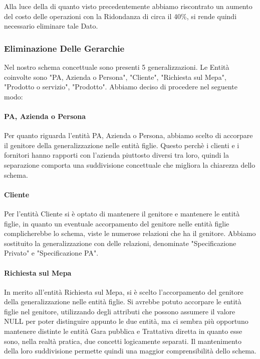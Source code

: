 Alla luce della di quanto visto precedentemente abbiamo riscontrato un aumento del costo delle operazioni con la Ridondanza di circa il 40\%, si rende quindi necessario eliminare tale Dato.


\newpage
\subsubsection{Eliminazione Delle Gerarchie}

Nel nostro schema concettuale sono presenti 5 generalizzazioni. Le Entità coinvolte sono "PA, Azienda o Persona", "Cliente", "Richiesta sul Mepa", "Prodotto o servizio", "Prodotto".
\newline
Abbiamo deciso di procedere nel seguente modo:

\paragraph{PA, Azienda o Persona}
Per quanto riguarda l'entità PA, Azienda o Persona, abbiamo scelto di accorpare il genitore della generalizzazione nelle entità figlie. Questo perchè i clienti e i fornitori hanno rapporti con l'azienda piuttosto diversi tra loro, quindi la separazione comporta una suddivisione concettuale che migliora la chiarezza dello schema.
\paragraph{Cliente}
Per l'entità Cliente si è optato di mantenere il genitore e mantenere le entità figlie, in quanto un eventuale accorpamento del genitore nelle entità figlie complicherebbe lo schema, viste le numerose relazioni che ha il genitore. Abbiamo sostituito la generalizzazione con delle relazioni, denominate "Specificazione Privato" e "Specificazione PA".
\paragraph{Richiesta sul Mepa}
In merito all'entità Richiesta sul Mepa, si è scelto l'accorpamento del genitore della generalizzazione nelle entità figlie. Si avrebbe potuto accorpare le entità figlie nel genitore, utilizzando degli attributi che possono assumere il valore NULL per poter distinguire appunto le due entità, ma ci sembra più opportuno mantenere distinte le entità Gara pubblica e Trattativa diretta in quanto esse sono, nella realtà pratica, due concetti logicamente separati. Il mantenimento della loro suddivisione permette quindi una maggior comprensibilità dello schema.
